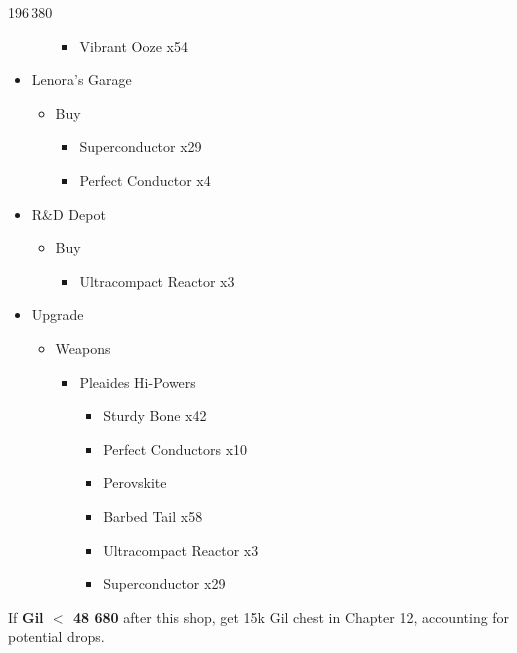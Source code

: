 \begin{shop}{196\,380}
\begin{itemize}
\begin{itemize}
\begin{itemize}
						\item Vibrant Ooze x54
					\end{itemize}
			\end{itemize}
		\item Lenora's Garage
			\begin{itemize}
				\item Buy
					\begin{itemize}
						\item Superconductor x29
						\item Perfect Conductor x4
					\end{itemize}
			\end{itemize}
		\item R\&D Depot
			\begin{itemize}
				\item Buy
					\begin{itemize}
						\item Ultracompact Reactor x3
					\end{itemize}
			\end{itemize}									
	\end{itemize}
\end{shop}

\begin{upgrade}
	\begin{itemize}
		\item Upgrade
			\begin{itemize}
				\item Weapons
					\begin{itemize}
						\item Pleaides Hi-Powers
							\begin{itemize}
								\item Sturdy Bone x42
								\item Perfect Conductors x10
								\item Perovskite
								\item Barbed Tail x58
								\item Ultracompact Reactor x3
								\item Superconductor x29
							\end{itemize}
					\end{itemize}
			\end{itemize}
	\end{itemize}
\end{upgrade}

If \textbf{Gil $<$ 48 680} after this shop, get 15k Gil chest in Chapter 12, accounting for potential drops.

